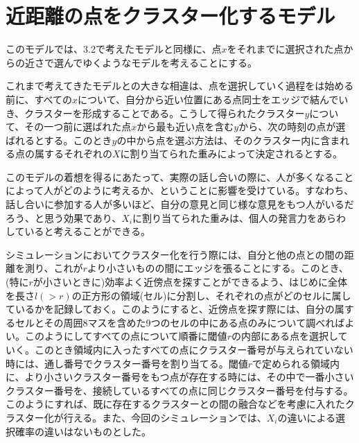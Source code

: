\section{近距離の点をクラスター化するモデル}

このモデルでは、3.2で考えたモデルと同様に、点$x$をそれまでに選択された点からの近さで選んでゆくようなモデルを考えることにする。

これまで考えてきたモデルとの大きな相違は、点を選択していく過程をは始める前に、すべての$x$について、自分から近い位置にある点同士をエッジで結んでいき、クラスターを形成することである。こうして得られたクラスター$y$について、その一つ前に選ばれた点$x$から最も近い点を含む$y$から、次の時刻の点が選ばれるとする。このとき$y$の中から点を選ぶ方法は、そのクラスター内に含まれる点の属するそれぞれの$X$に割り当てられた重みによって決定されるとする。

このモデルの着想を得るにあたって、実際の話し合いの際に、人が多くなることによって人がどのように考えるか、ということに影響を受けている。すなわち、話し合いに参加する人が多いほど、自分の意見と同じ様な意見をもつ人がいるだろう、と思う効果であり、$X_{i}$に割り当てられた重みは、個人の発言力をあらわしていると考えることができる。

シミュレーションにおいてクラスター化を行う際には、自分と他の点との間の距離を測り、これが$r$より小さいものの間にエッジを張ることにする。このとき、(特に$r$が小さいときに)効率よく近傍点を探すことができるよう、はじめに全体を長さ$l(>r)$の正方形の領域(セル)に分割し、それぞれの点がどのセルに属しているかを記録しておく。このようにすると、近傍点を探す際には、自分の属するセルとその周囲8マスを含めた9つのセルの中にある点のみについて調べればよい。このようにしてすべての点について順番に閾値$r$の内部にある点を選択していく。このとき領域内に入ったすべての点にクラスター番号が与えられていない時には、通し番号でクラスター番号を割り当てる。閾値$r$で定められる領域内に、より小さいクラスター番号をもつ点が存在する時には、その中で一番小さいクラスター番号を、接続しているすべての点に同じクラスター番号を付与する。このようにすれば、既に存在するクラスターとの間の融合などを考慮に入れたクラスター化が行える。また、今回のシミュレーションでは、$X_{i}$の違いによる選択確率の違いはないものとした。

